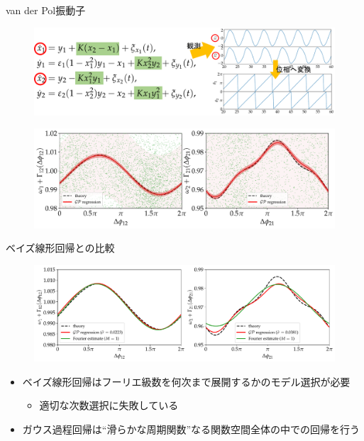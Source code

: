 \begin{frame}{van der Pol振動子}
\begin{figure}
  \includegraphics[height=0.35\textheight]{figs/vdp_schematic.pdf}
\end{figure}
\begin{figure}
  \includegraphics[width=\textwidth]{figs/exp01case01.pdf}
\end{figure}
\end{frame}

\begin{frame}{ベイズ線形回帰との比較}
  \begin{figure}
    \centering
    \includegraphics[width=\textwidth]{figs/vdp.pdf}
  \end{figure}
  \begin{itemize}
    \item ベイズ線形回帰はフーリエ級数を何次まで展開するかのモデル選択が必要
    \begin{itemize}
      \item 適切な次数選択に失敗している
    \end{itemize}
    \item ガウス過程回帰は``滑らかな周期関数''なる関数空間全体の中での回帰を行う
  \end{itemize}
\end{frame}

